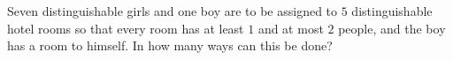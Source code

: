 Seven distinguishable girls and one boy are to be assigned to $5$ distinguishable hotel rooms so that every room has at least $1$ and at most $2$ people, and the boy has a room to himself. In how many ways can this be done?
